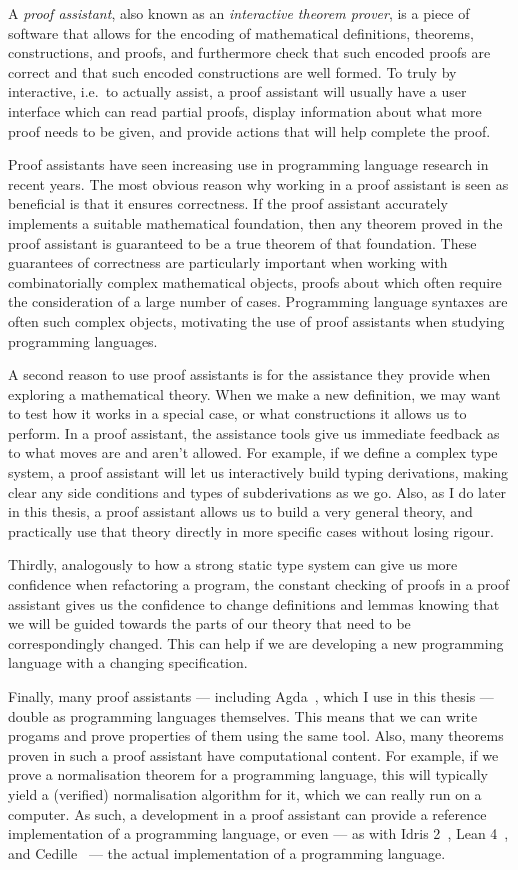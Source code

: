 A \emph{proof assistant}, also known as an \emph{interactive theorem prover}, is
a piece of software that allows for the encoding of mathematical definitions,
theorems, constructions, and proofs, and furthermore check that such encoded
proofs are correct and that such encoded constructions are well formed.
To truly by interactive, i.e.\ to actually assist, a proof assistant will
usually have a user interface which can read partial proofs, display
information about what more proof needs to be given, and provide actions that
will help complete the proof.

Proof assistants have seen increasing use in programming language research in
recent years.
The most obvious reason why working in a proof assistant is seen as beneficial
is that it ensures correctness.
If the proof assistant accurately implements a suitable mathematical foundation,
then any theorem proved in the proof assistant is guaranteed to be a true
theorem of that foundation.
These guarantees of correctness are particularly important when working with
combinatorially complex mathematical objects, proofs about which often require
the consideration of a large number of cases.
Programming language syntaxes are often such complex objects, motivating the use
of proof assistants when studying programming languages.

A second reason to use proof assistants is for the assistance they provide when
exploring a mathematical theory.
When we make a new definition, we may want to test how it works in a special
case, or what constructions it allows us to perform.
In a proof assistant, the assistance tools give us immediate feedback as to what
moves are and aren't allowed.
For example, if we define a complex type system, a proof assistant will let us
interactively build typing derivations, making clear any side conditions and
types of subderivations as we go.
Also, as I do later in this thesis, a proof assistant allows us to build a very
general theory, and practically use that theory directly in more specific cases
without losing rigour.

Thirdly, analogously to how a strong static type system can give us more
confidence when refactoring a program, the constant checking of proofs in a
proof assistant gives us the confidence to change definitions and lemmas knowing
that we will be guided towards the parts of our theory that need to be
correspondingly changed.
This can help if we are developing a new programming language with a changing
specification.

Finally, many proof assistants --- including Agda~\citep{Agda}, which I use in
this thesis --- double as programming languages themselves.
This means that we can write progams and prove properties of them using the same
tool.
Also, many theorems proven in such a proof assistant have computational content.
For example, if we prove a normalisation theorem for a programming language,
this will typically yield a (verified) normalisation algorithm for it, which we
can really run on a computer.
As such, a development in a proof assistant can provide a reference
implementation of a programming language, or even --- as with Idris
2~\citep{Brady21}, Lean 4~\citep{deMU21}, and Cedille~\citep{GRS16} --- the
actual implementation of a programming language.

